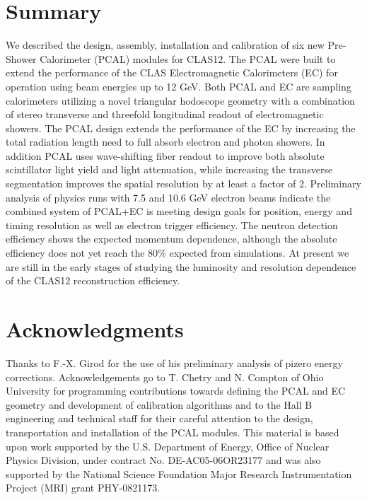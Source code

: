 \section{Summary}
We described the design, assembly, installation and calibration of six new Pre-Shower Calorimeter (PCAL) modules for CLAS12.  The PCAL were built to extend the performance of the CLAS Electromagnetic Calorimeters (EC) for operation using beam energies up to 12 GeV.  Both PCAL and EC are sampling calorimeters utilizing a novel triangular hodoscope geometry with a combination of stereo transverse and threefold longitudinal readout of electromagnetic showers.  The PCAL design extends the performance of the EC by increasing the total radiation length need to full absorb electron and photon showers.  In addition PCAL uses wave-shifting fiber readout to improve both absolute scintillator light yield and light attenuation, while increasing the transverse segmentation improves the spatial resolution by at least a factor of 2.    Preliminary analysis of physics runs with 7.5 and 10.6 GeV electron beams indicate the combined system of PCAL+EC is meeting design goals for position, energy and timing resolution as well as electron trigger efficiency.  The neutron detection efficiency shows the expected momentum dependence, although the absolute efficiency does not yet reach the 80$\%$ expected from simulations.  At present we are still in the early stages of studying the luminosity and resolution dependence of the CLAS12 reconstruction efficiency.

\section*{Acknowledgments}

Thanks to F.-X. Girod for the use of his preliminary analysis of pizero energy corrections.  Acknowledgements go to T. Chetry and N. Compton of Ohio University for programming contributions towards defining the PCAL and EC geometry and development of  calibration algorithms and to the Hall B engineering and technical staff for their careful attention to the design, transportation and installation of the PCAL modules.
This material is based upon work supported by the U.S. Department of Energy, Office of Nuclear Physics Division, under contract No. DE-AC05-06OR23177 and was also supported by the National Science Foundation Major Research Instrumentation Project (MRI) grant PHY-0821173.





